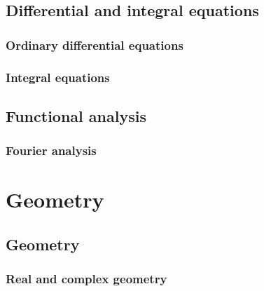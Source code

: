 \documentclass[a4paper]{book}
\begin{document}
	

	\chapter{Differential and integral equations}

    \section{Ordinary differential equations}

    
    

    \section{Integral equations}

    
    
    
	
	

	\chapter{Functional analysis}

	\section{Fourier analysis}

	

    \part{Geometry}

    \chapter{Geometry}

    \section{Real and complex geometry}
    
	
	
	
\end{document}
